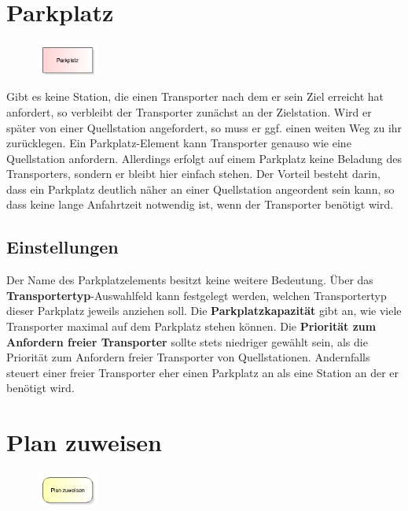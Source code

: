 \section{Parkplatz}
\label{ref:ModelElementTransportParking}

\begin{figure}
\vspace{-22pt}
\includegraphics[width=2cm]{imageModelElementTransportParking.png}
\vspace{-22pt}
\end{figure}

Gibt es keine Station, die einen Transporter nach dem er sein Ziel erreicht hat
anfordert, so verbleibt der Transporter zunächst an der Zielstation. Wird er später
von einer Quellstation angefordert, so muss er ggf. einen weiten Weg zu ihr zurücklegen.
Ein Parkplatz-Element kann Transporter genauso wie eine Quellstation anfordern.
Allerdings erfolgt auf einem Parkplatz keine Beladung des Transporters, sondern er
bleibt hier einfach stehen. Der Vorteil besteht darin, dass ein Parkplatz deutlich
näher an einer Quellstation angeordent sein kann, so dass keine lange Anfahrtzeit
notwendig ist, wenn der Transporter benötigt wird.

\subsection*{Einstellungen}

Der Name des Parkplatzelements besitzt keine weitere Bedeutung.
Über das \textbf{Transportertyp}-Auswahlfeld kann festgelegt werden, welchen
Transportertyp dieser Parkplatz jeweils anziehen soll. Die \textbf{Parkplatzkapazität}
gibt an, wie viele Transporter maximal auf dem Parkplatz stehen können.
Die \textbf{Priorität zum Anfordern freier Transporter} sollte stets niedriger
gewählt sein, als die Priorität zum Anfordern freier Transporter von Quellstationen.
Andernfalls steuert einer freier Transporter eher einen Parkplatz an als eine
Station an der er benötigt wird.


\section{Plan zuweisen}
\label{ref:ModelElementAssignSequence}

\begin{figure}
\vspace{-22pt}
\includegraphics[width=2cm]{imageModelElementAssignSequence.png}
\vspace{-22pt}
\end{figure}

